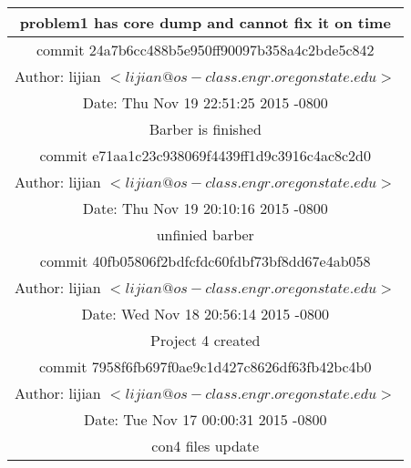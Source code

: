 \documentclass[letterpaper,11pt,titlepage]{article}
\begin{document}
\begin{table}[!hbp]
\begin{tabular}{|c|}
    problem1 has core dump and cannot fix it on time\\
\hline
commit 24a7b6cc488b5e950ff90097b358a4c2bde5c842\\
Author: lijian $<lijian@os-class.engr.oregonstate.edu>$\\
Date:   Thu Nov 19 22:51:25 2015 -0800\\

    Barber is finished\\
\hline
commit e71aa1c23c938069f4439ff1d9c3916c4ac8c2d0\\
Author: lijian $<lijian@os-class.engr.oregonstate.edu>$\\
Date:   Thu Nov 19 20:10:16 2015 -0800\\

    unfinied barber\\
\hline
commit 40fb05806f2bdfcfdc60fdbf73bf8dd67e4ab058\\
Author: lijian $<lijian@os-class.engr.oregonstate.edu>$\\
Date:   Wed Nov 18 20:56:14 2015 -0800\\

    Project 4 created\\
\hline
commit 7958f6fb697f0ae9c1d427c8626df63fb42bc4b0\\
Author: lijian $<lijian@os-class.engr.oregonstate.edu>$\\
Date:   Tue Nov 17 00:00:31 2015 -0800\\

    con4 files update\\
\hline



 
\end{tabular}
\end{table}
\end{document}
